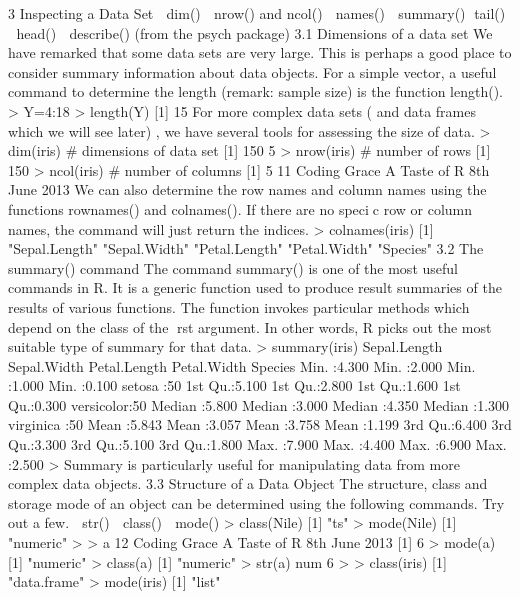 3 Inspecting a Data Set
 dim()
 nrow() and ncol()
 names()
 summary()
 tail()
 head()
 describe() (from the psych package)
3.1 Dimensions of a data set
We have remarked that some data sets are very large. This is perhaps a good place to consider
summary information about data objects. For a simple vector, a useful command to determine
the length (remark: sample size) is the function length().
> Y=4:18
> length(Y)
[1] 15
For more complex data sets ( and data frames which we will see later) , we have several
tools for assessing the size of data.
> dim(iris) # dimensions of data set
[1] 150 5
> nrow(iris) # number of rows
[1] 150
> ncol(iris) # number of columns
[1] 5
11
Coding Grace A Taste of R 8th June 2013
We can also determine the row names and column names using the functions rownames()
and colnames(). If there are no specic row or column names, the command will just return
the indices.
> colnames(iris)
[1] "Sepal.Length" "Sepal.Width" "Petal.Length" "Petal.Width" "Species"
3.2 The summary() command
The command summary() is one of the most useful commands in R. It is a generic function used
to produce result summaries of the results of various functions. The function invokes particular
methods which depend on the class of the rst argument. In other words, R picks out the most
suitable type of summary for that data.
> summary(iris)
Sepal.Length Sepal.Width Petal.Length Petal.Width Species
Min. :4.300 Min. :2.000 Min. :1.000 Min. :0.100 setosa :50
1st Qu.:5.100 1st Qu.:2.800 1st Qu.:1.600 1st Qu.:0.300 versicolor:50
Median :5.800 Median :3.000 Median :4.350 Median :1.300 virginica :50
Mean :5.843 Mean :3.057 Mean :3.758 Mean :1.199
3rd Qu.:6.400 3rd Qu.:3.300 3rd Qu.:5.100 3rd Qu.:1.800
Max. :7.900 Max. :4.400 Max. :6.900 Max. :2.500
>
Summary is particularly useful for manipulating data from more complex data objects.
3.3 Structure of a Data Object
The structure, class and storage mode of an object can be determined using the following
commands. Try out a few.
 str()
 class()
 mode()
> class(Nile)
[1] "ts"
> mode(Nile)
[1] "numeric"
>
> a
12
Coding Grace A Taste of R 8th June 2013
[1] 6
> mode(a)
[1] "numeric"
> class(a)
[1] "numeric"
> str(a)
num 6
>
> class(iris)
[1] "data.frame"
> mode(iris)
[1] "list"
